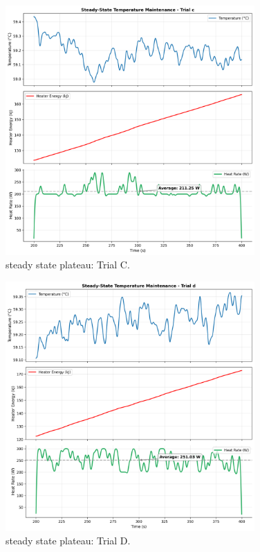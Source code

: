\documentclass[12pt]{article}
\begin{document}
\begin{figure}[H]
\centering
\includegraphics[width=0.85\textwidth]{graphs/part2_trial_c_heater_maintenance.png}
\caption{steady state plateau: Trial C.}
\end{figure}

\begin{figure}[H]
\centering
\includegraphics[width=0.85\textwidth]{graphs/part2_trial_d_heater_maintenance.png}
\caption{steady state plateau: Trial D.}
\end{figure}
\end{document}
